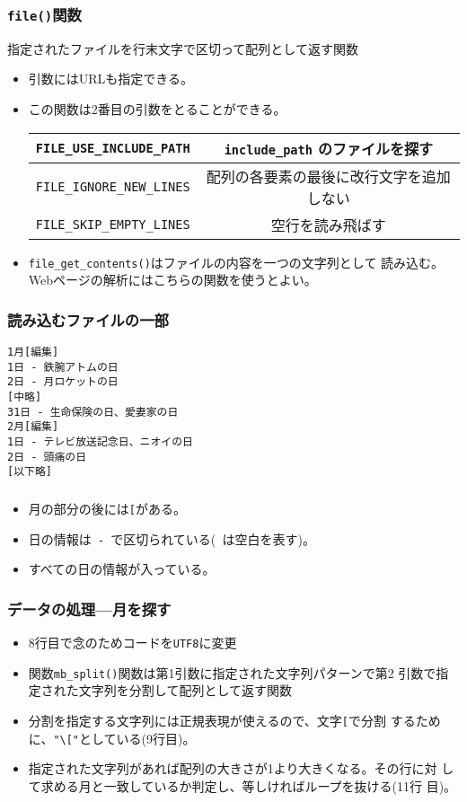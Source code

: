 \documentclass[dvipsk]{beamer}
\begin{document}
\begin{frame}[containsverbatim]
\frametitle{\texttt{file()}関数}
指定されたファイルを行末文字で区切って配列として返す関数\\
\begin{itemize}
\item 引数にはURLも指定できる。
\item この関数は2番目の引数をとることができる。
\begin{center}
 \begin{tabular}{|c|c|}\hline
 \verb+FILE_USE_INCLUDE_PATH+ & \verb+include_path+ のファイルを探す\\\hline
 \verb+FILE_IGNORE_NEW_LINES+ & 配列の各要素の最後に改行文字を追加しない
      \\ \hline
  \verb+FILE_SKIP_EMPTY_LINES+&空行を読み飛ばす \\ \hline
 \end{tabular}
\end{center}
 \item \verb+file_get_contents()+はファイルの内容を一つの文字列として
       読み込む。Webページの解析にはこちらの関数を使うとよい。
\end{itemize}
\end{frame}
\begin{frame}[containsverbatim]
\frametitle{読み込むファイルの一部}
\begin{verbatim}
1月[編集]
1日 - 鉄腕アトムの日
2日 - 月ロケットの日
[中略]
31日 - 生命保険の日、愛妻家の日
2月[編集]
1日 - テレビ放送記念日、ニオイの日
2日 - 頭痛の日
[以下略]
\end{verbatim}
\end{frame}
\begin{frame}[containsverbatim]
\frametitle{}
\begin{itemize}
 \item 月の部分の後には\texttt{[}がある。
 \item 日の情報は\verb*+ - +で区切られている(\verb*+ +は空白を表す)。
 \item すべての日の情報が入っている。
\end{itemize}
\end{frame}
\begin{frame}[containsverbatim]
\frametitle{データの処理---月を探す}
\begin{itemize}
 \item 8行目で念のためコードを\texttt{UTF8}に変更
 \item 関数\verb+mb_split()+関数は第1引数に指定された文字列パターンで第2
       引数で指定された文字列を分割して配列として返す関数
 \item 分割を指定する文字列には正規表現が使えるので、文字\verb+[+で分割
       するために、\verb+"\["+としている(9行目)。
 \item 指定された文字列があれば配列の大きさが1より大きくなる。その行に対
       して求める月と一致しているか判定し、等しければループを抜ける(11行
       目)。
\end{itemize}
\end{frame}
\end{document}
